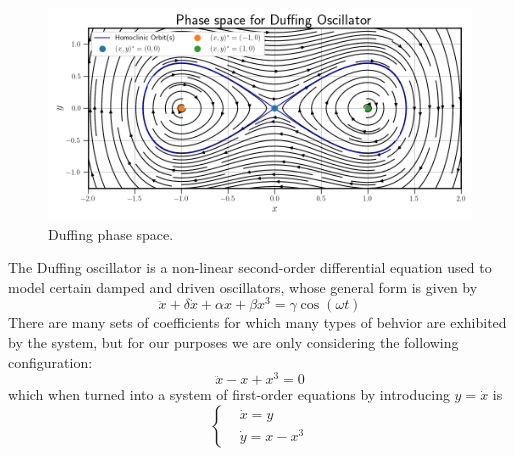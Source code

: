 \begin{figure}[!ht]
    \centering
    \begin{minipage}{\textwidth}
        \includegraphics[width=\textwidth]{"Figures/duffing_phase_space.png"}
    \end{minipage}
    \caption{Duffing phase space.}
    \label{fig:duffing phase space}
\end{figure}

The Duffing oscillator is a non-linear second-order differential equation used to model 
certain damped and driven oscillators, whose general form is given by
\begin{equation}
    \ddot{x} + \delta\dot{x} + \alpha x + \beta x^3 = \gamma\cos(\omega t)
\end{equation}
There are many sets of coefficients for which many types of behvior are exhibited by the
system, but for our purposes we are only considering the following configuration:
\begin{equation}
    \ddot{x} - x + x^3 = 0
\end{equation}
which when turned into a system of first-order equations by introducing $y = \dot{x}$ is
\begin{equation}
    \begin{cases}
        & \dot{x} = y \\
        & \dot{y} = x - x^3  
    \end{cases}
\end{equation}

